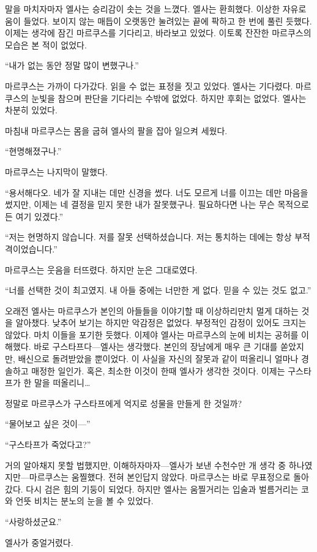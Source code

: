 말을 마치자마자 엘사는 승리감이 솟는 것을 느꼈다. 엘사는 환희했다. 이상한 자유로움이 들었다. 보이지 않는 매듭이 오랫동안 눌려있는 끝에 팍하고 한 번에 풀린 듯했다. 이제는 생각에 잠긴 마르쿠스를 기다리고, 바라보고 있었다. 이토록 잔잔한 마르쿠스의 모습은 본 적이 없었다.

``내가 없는 동안 정말 많이 변했구나.''

마르쿠스는 가까이 다가갔다. 읽을 수 없는 표정을 짓고 있었다. 엘사는 기다렸다. 마르쿠스의 눈빛을 참으며 판단을 기다리는 수밖에 없었다. 하지만 후회는 없었다. 엘사는 차분히 있었다.

마침내 마르쿠스는 몸을 굽혀 엘사의 팔을 잡아 일으켜 세웠다.

``현명해졌구나.''

마르쿠스는 나지막이 말했다.

``용서해다오. 네가 잘 지내는 데만 신경을 썼다. 너도 모르게 너를 이끄는 데만 마음을 썼지만, 이제는 네 결정을 믿지 못한 내가 잘못했구나. 필요하다면 나는 무슨 목적으로든 여기 있겠다.''

``저는 현명하지 않습니다. 저를 잘못 선택하셨습니다. 저는 통치하는 데에는 항상 부적격이었습니다.''

마르쿠스는 웃음을 터뜨렸다. 하지만 눈은 그대로였다.

``너를 선택한 것이 최고였지. 내 아들 중에는 너만한 게 없다. 믿을 수 있는 것도 없고.''

오래전 엘사는 마르쿠스가 본인의 아들들을 이야기할 때 이상하리만치 멀게 대하는 것을 알아챘다. 낮추어 보기는 하지만 악감정은 없었다. 부정적인 감정이 있어도 크지는 않았다. 마치 이들을 포기한 듯했다. 이제야 엘사는 마르쿠스의 눈에 비치는 공허를 이해했다. 바로 구스타프다—엘사는 생각했다. 본인의 장남에게 매우 큰 기대를 쏟았지만, 배신으로 돌려받았을 뿐이었다. 이 사실을 자신의 잘못과 같이 떠올리니 얼마나 경솔하고 매정한 일인가. 혹은, 최소한 이것이 한때 엘사가 생각한 것이다. 이제는 구스타프가 한 말을 떠올리니\ldots

정말로 마르쿠스가 구스타프에게 억지로 성물을 만들게 한 것일까?

``물어보고 싶은 것이—''

``구스타프가 죽었다고?''

거의 알아채지 못할 법했지만, 이해하자마자—엘사가 보낸 수천수만 개 생각 중 하나였지만—마르쿠스는 움찔했다. 전혀 본인답지 않았다. 마르쿠스는 바로 무표정으로 돌아갔다. 다시 검은 힘의 기둥이 되었다. 하지만 엘사는 움찔거리는 입술과 벌름거리는 코와 언뜻 비치는 분노의 눈을 볼 수 있었다.

``사랑하셨군요.''

엘사가 중얼거렸다.

